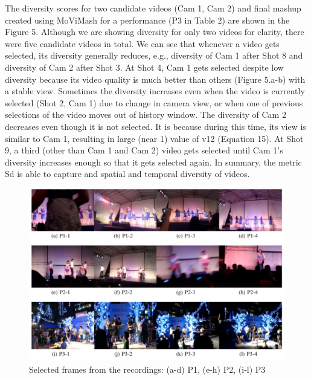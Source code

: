 \documentclass{sig-alternate}
\begin{document}
      The diversity scores for two candidate videos (Cam 1, Cam 2) and final mashup created using MoViMash for a performance (P3 in Table 2) are shown in the Figure 5. Although we are showing diversity for only two videos for clarity, there were five candidate videos in total. We can see that whenever a video gets selected, its diversity generally reduces, e.g., diversity of Cam 1 after Shot 8 and diversity of Cam 2 after Shot 3. At Shot 4, Cam 1 gets selected despite low diversity because its video quality is much better than others (Figure 5.a-b) with a stable view. Sometimes the diversity increases even when the video is currently selected (Shot 2, Cam 1) due to change in camera view, or when one of previous selections of the video moves out of history window. The diversity of Cam 2 decreases even though it is not selected. It is because during this time, its view is similar to Cam 1, resulting in large (near 1) value of v12 (Equation 15). At Shot 9, a third (other than Cam 1 and Cam 2) video gets selected until Cam 1’s diversity increases enough so that it gets selected again. In summary, the metric Sd is able to capture and spatial and temporal diversity of videos.
    \begin{figure}[h]
    \centering
    \includegraphics[width=01\textwidth]{img6.png}
    \caption{Selected frames from the recordings: (a-d) P1, (e-h) P2, (i-l) P3}
    \label{fig:mesh6}
\end{figure}

    
\end{document}
